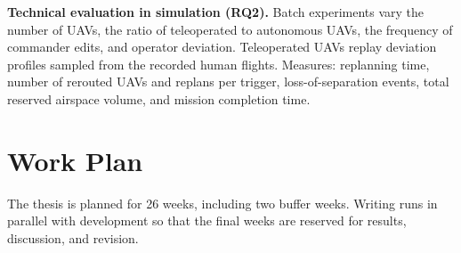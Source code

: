 \documentclass{article}
\begin{document}
\textbf{Technical evaluation in simulation (RQ2).} Batch experiments vary the number of UAVs, the ratio of teleoperated to autonomous UAVs, the frequency of commander edits, and operator deviation.
Teleoperated UAVs replay deviation profiles sampled from the recorded human flights.
Measures: replanning time, number of rerouted UAVs and replans per trigger, loss-of-separation events, total reserved airspace volume, and mission completion time.

\section{Work Plan}

The thesis is planned for 26 weeks, including two buffer weeks. Writing runs in parallel with development so that the final weeks are reserved for results, discussion, and revision.
\end{document}
